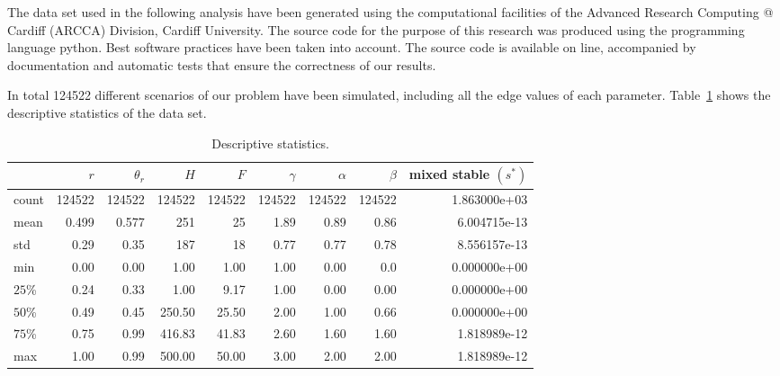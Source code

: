 \documentclass[10pt]{article}
\begin{document}
The data set used in the following analysis have been generated using the 
computational facilities of the Advanced Research Computing @ Cardiff (ARCCA) 
Division, Cardiff University. The source code for the purpose of this
research was produced using the programming language python. Best software
practices have been taken into account. The source code is available on line, %
accompanied by documentation and automatic tests that ensure the correctness
of our results.

In total 124522 different scenarios of our problem have been simulated, including
all the edge values of each parameter. Table~\ref{tbl:descriptive_stats} shows
the descriptive statistics of the data set.

\begin{table}[!hbtp]
	\begin{center}
\begin{tabular}{lrrrrrrrr}
\toprule {} &              \(r\) &        \(\theta_r\) &              \(H\) &              \(F\) &          \(\gamma\) &          \(\alpha\) &          \(\beta\) &  mixed stable \((s^*)\)\\
\midrule
count 		&  124522  &  124522 &     124522 &   124522 &   124522 &      124522 &   124522 & 1.863000e+03 \\
mean         &      0.499 &     0.577 & 		251 &            25 &       1.89 &       0.89 &            0.86 &    6.004715e-13 \\
std             &       0.29 &       0.35 &          187 &             18 &       0.77 &       0.77 &            0.78 &     8.556157e-13 \\
min   		&       0.00 &       0.00 &         1.00 &          1.00 &       1.00 &       0.00 &              0.0 &    0.000000e+00 \\
\(25\)\%  	&       0.24 &       0.33 &         1.00 &          9.17 &       1.00 &       0.00 &            0.00 &     0.000000e+00 \\
\(50\)\%  	&       0.49 &       0.45 &     250.50 &        25.50 &       2.00 &       1.00 &            0.66 &      0.000000e+00 \\
\(75\)\%  	&       0.75 &       0.99 &     416.83 &      41.83 &          2.60&       1.60 &            1.60 &        1.818989e-12 \\
max   		&       1.00 &       0.99 &     500.00 &      50.00 &         3.00 &       2.00 &           2.00 &          1.818989e-12 \\
\bottomrule
\end{tabular}
      \caption{Descriptive statistics.}
      \label{tbl:descriptive_stats}
  	\end{center}
\end{table}
\end{document}
